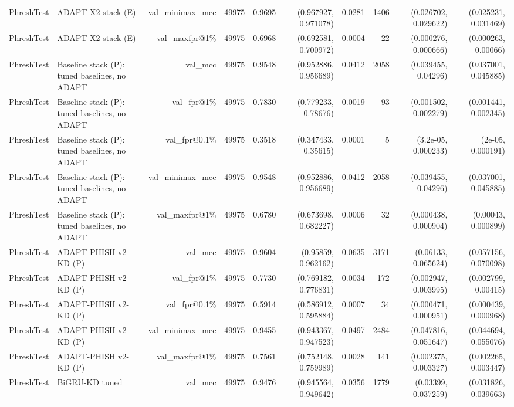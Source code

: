 \begin{table}[t]
\begin{tabular}{llrrrrrrrr}
PhreshTest & ADAPT-X2 stack (E) & val\_minimax\_mcc & 49975 & 0.9695 & (0.967927, 0.971078) & 0.0281 & 1406 & (0.026702, 0.029622) & (0.025231, 0.031469) \\
PhreshTest & ADAPT-X2 stack (E) & val\_maxfpr@1\% & 49975 & 0.6968 & (0.692581, 0.700972) & 0.0004 & 22 & (0.000276, 0.000666) & (0.000263, 0.00066) \\
PhreshTest & Baseline stack (P): tuned baselines, no ADAPT & val\_mcc & 49975 & 0.9548 & (0.952886, 0.956689) & 0.0412 & 2058 & (0.039455, 0.04296) & (0.037001, 0.045885) \\
PhreshTest & Baseline stack (P): tuned baselines, no ADAPT & val\_fpr@1\% & 49975 & 0.7830 & (0.779233, 0.78676) & 0.0019 & 93 & (0.001502, 0.002279) & (0.001441, 0.002345) \\
PhreshTest & Baseline stack (P): tuned baselines, no ADAPT & val\_fpr@0.1\% & 49975 & 0.3518 & (0.347433, 0.35615) & 0.0001 & 5 & (3.2e-05, 0.000233) & (2e-05, 0.000191) \\
PhreshTest & Baseline stack (P): tuned baselines, no ADAPT & val\_minimax\_mcc & 49975 & 0.9548 & (0.952886, 0.956689) & 0.0412 & 2058 & (0.039455, 0.04296) & (0.037001, 0.045885) \\
PhreshTest & Baseline stack (P): tuned baselines, no ADAPT & val\_maxfpr@1\% & 49975 & 0.6780 & (0.673698, 0.682227) & 0.0006 & 32 & (0.000438, 0.000904) & (0.00043, 0.000899) \\
PhreshTest & ADAPT-PHISH v2-KD (P) & val\_mcc & 49975 & 0.9604 & (0.95859, 0.962162) & 0.0635 & 3171 & (0.06133, 0.065624) & (0.057156, 0.070098) \\
PhreshTest & ADAPT-PHISH v2-KD (P) & val\_fpr@1\% & 49975 & 0.7730 & (0.769182, 0.776831) & 0.0034 & 172 & (0.002947, 0.003995) & (0.002799, 0.00415) \\
PhreshTest & ADAPT-PHISH v2-KD (P) & val\_fpr@0.1\% & 49975 & 0.5914 & (0.586912, 0.595884) & 0.0007 & 34 & (0.000471, 0.000951) & (0.000439, 0.000968) \\
PhreshTest & ADAPT-PHISH v2-KD (P) & val\_minimax\_mcc & 49975 & 0.9455 & (0.943367, 0.947523) & 0.0497 & 2484 & (0.047816, 0.051647) & (0.044694, 0.055076) \\
PhreshTest & ADAPT-PHISH v2-KD (P) & val\_maxfpr@1\% & 49975 & 0.7561 & (0.752148, 0.759989) & 0.0028 & 141 & (0.002375, 0.003327) & (0.002265, 0.003447) \\
PhreshTest & BiGRU-KD tuned & val\_mcc & 49975 & 0.9476 & (0.945564, 0.949642) & 0.0356 & 1779 & (0.03399, 0.037259) & (0.031826, 0.039663) \\

\end{tabular}
\end{table}
